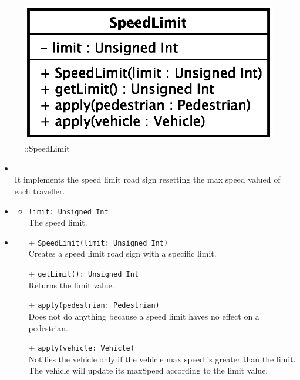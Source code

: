 \begin{figure}[h]
\centering
\includegraphics[scale=0.6,keepaspectratio]{images/solution/app/backend/speed_limit.eps}
\caption{\pPassive::SpeedLimit}
\label{fig:sd-app-speed_limit}
\end{figure}
\FloatBarrier
\begin{itemize}
  \item \textbf{\descr} \\
It implements the speed limit road sign resetting the max speed valued of each traveller.
  \item \textbf{\attrs}
  \begin{itemize}
    \item \texttt{limit: Unsigned Int} \\
The speed limit.
  \end{itemize}
  \item \textbf{\ops}
  \begin{itemize} 
  \item[+] \texttt{SpeedLimit(limit: Unsigned Int)} \\
Creates a speed limit road sign with a specific limit.
  \item[+] \texttt{getLimit(): Unsigned Int} \\
Returns the limit value.
  \item[+] \texttt{apply(pedestrian: Pedestrian)} \\
Does not do anything because a speed limit haves no effect on a pedestrian.
  \item[+] \texttt{apply(vehicle: Vehicle)} \\
Notifies the vehicle only if the vehicle max speed is greater than the limit.
The vehicle will update its maxSpeed according to the limit value.
  \end{itemize}
\end{itemize}
